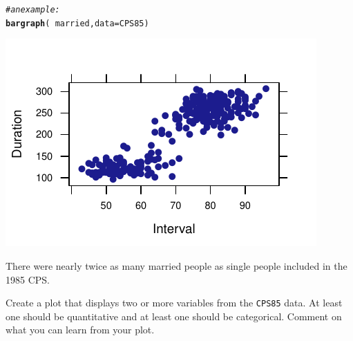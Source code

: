 \documentclass[twoside]{book}\usepackage[]{graphicx}\usepackage[]{xcolor}
\makeatletter
\def\maxwidth{ %
  \ifdim\Gin@nat@width>\linewidth
    \linewidth
  \else
    \Gin@nat@width
  \fi
}
\newcommand{\hlcom}[1]{\textcolor[rgb]{0.678,0.584,0.686}{\textit{#1}}}%
\newcommand{\hlopt}[1]{\textcolor[rgb]{0,0,0}{#1}}%
\newcommand{\hlstd}[1]{\textcolor[rgb]{0.345,0.345,0.345}{#1}}%
\newcommand{\hlkwc}[1]{\textcolor[rgb]{0.333,0.667,0.333}{#1}}%
\newcommand{\hlkwd}[1]{\textcolor[rgb]{0.737,0.353,0.396}{\textbf{#1}}}%
\newenvironment{kframe}{%
 \def\at@end@of@kframe{}%
 \ifinner\ifhmode%
  \def\at@end@of@kframe{\end{minipage}}%
  \begin{minipage}{\columnwidth}%
 \fi\fi%
 \def\FrameCommand##1{\hskip\@totalleftmargin \hskip-\fboxsep
 \colorbox{shadecolor}{##1}\hskip-\fboxsep
     \hskip-\linewidth \hskip-\@totalleftmargin \hskip\columnwidth}%
 \MakeFramed {\advance\hsize-\width
   \@totalleftmargin\z@ \linewidth\hsize
   \@setminipage}}%
 {\par\unskip\endMakeFramed%
 \at@end@of@kframe}
\newenvironment{knitrout}{}{} %
\newcommand{\Rindex}[1]{\index{\texttt{#1}}}
\newcommand{\dataframe}[1]{{\color{blue!80!black}\texttt{#1}}\Rindex{#1}}
\newcounter{example}[section]
\makeatother
\begin{document}
\begin{solution}
\begin{knitrout}
\color{fgcolor}\begin{kframe}
\begin{alltt}
\hlcom{# an example:}
\hlkwd{bargraph}\hlstd{(}\hlopt{~}\hlstd{married,} \hlkwc{data} \hlstd{= CPS85)}
\end{alltt}
\end{kframe}

{\centering \includegraphics[width=\maxwidth]{figures/fig-unnamed-chunk-20-1} 

}



\end{knitrout}
There were nearly twice as many married people as single people included in the 1985 CPS. 
\end{solution}


\begin{problem}
	Create a plot that displays two or more variables from the 
	\dataframe{CPS85} data.  At least one should be quantitative 
	and at least one should be categorical.
	Comment on what you can learn from your plot.
\end{problem}
\end{document}
